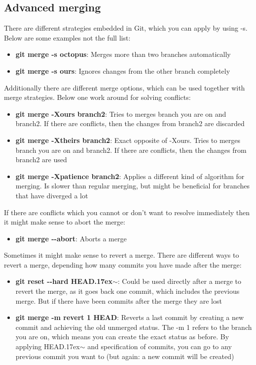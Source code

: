 \documentclass[12pt]{article}
\begin{document}
\subsection{Advanced merging}
There are different strategies embedded in Git, which you can apply by using -s. Below are some examples not the full list:
\begin {itemize}
\item \textbf{git merge -s octopus}: Merges more than two branches automatically
\item \textbf{git merge -s ours}: Ignores changes from the other branch completely
\end{itemize}
Additionally there are different merge options, which can be used together with merge strategies. Below one work around for solving conflicts:
\begin {itemize}
\item \textbf{git merge -Xours branch2}: Tries to merges branch you are on and branch2. If there are conflicts, then the changes from branch2 are discarded
\item \textbf{git merge -Xtheirs branch2}: Exact opposite of -Xours. Tries to merges branch you are on and branch2. If there are conflicts, then the changes from branch2 are used
\item \textbf{git merge -Xpatience branch2}: Applies a different kind of algorithm for merging. Is slower than regular merging, but might be beneficial for branches that have diverged a lot
\end{itemize}
If there are conflicts which you cannot or don't want to resolve immediately then it might make sense to abort the merge:
\begin {itemize}
\item \textbf{git merge \textrm{-}\textrm{-}abort}: Aborts a merge
\end{itemize}
Sometimes it might make sense to revert a merge. There are different ways to revert a merge, depending how many commits you have made after the merge:
\begin {itemize}
\item \textbf{git reset \textrm{-}\textrm{-}hard HEAD{\raise.17ex\hbox{$\scriptstyle\mathtt{\sim}$}}}: Could be used directly after a merge to revert the merge, as it goes back one commit, which includes the previous merge. But if there have been commits after the merge they are lost
\item \textbf{git merge -m revert 1 HEAD}: Reverts a last commit by creating a new commit and achieving the old unmerged status. The -m 1 refers to the branch you are on, which means you can create the exact status as before. By applying HEAD{\raise.17ex\hbox{$\scriptstyle\mathtt{\sim}$}} and specification of commits, you can go to any previous commit you want to (but again: a new commit will be created)
\end{itemize}
\end{document}
